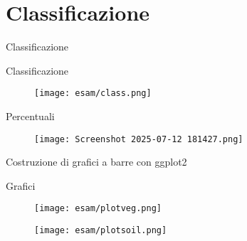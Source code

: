 \documentclass{beamer} %
\begin{document}
\section{Classificazione}

        \begin{frame}{Classificazione}
            
        \end{frame}

        \begin{frame}{Classificazione}
            \begin{figure}
                \centering
                \texttt{[image: esam/class.png]}
            \end{figure}
        \end{frame}

        \begin{frame}{Percentuali}
            
            
            
            
            \begin{figure}
                \centering
                \texttt{[image: Screenshot 2025-07-12 181427.png]}
            \end{figure}
        \end{frame}

        \begin{frame}{Costruzione di grafici a barre con ggplot2}
            
        \end{frame}

        \begin{frame}{Grafici}
            \begin{multicols}{2}
                \begin{figure}
                    \centering
                    \texttt{[image: esam/plotveg.png]}
                \end{figure}
                \columnbreak
                \begin{figure}
                    \centering
                    \texttt{[image: esam/plotsoil.png]}
                \end{figure}
            \end{multicols}
        \end{frame}
\end{document}
